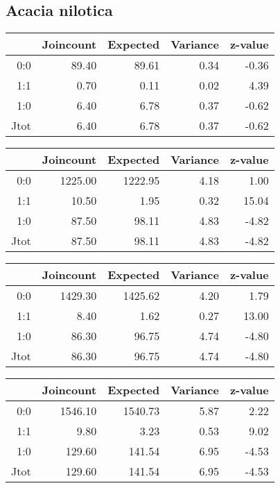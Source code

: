 \documentclass[a4paper, oneside, 12pt]{book}
\begin{document}
\subsection{Acacia nilotica}
\begin{table}[H]
	\centering
	\begin{tabular}{rrrrr}
		\hline
		& Joincount & Expected & Variance & z-value \\ 
		\hline
		0:0 & 89.40 & 89.61 & 0.34 & -0.36 \\ 
		1:1 & 0.70 & 0.11 & 0.02 & 4.39 \\ 
		1:0 & 6.40 & 6.78 & 0.37 & -0.62 \\ 
		Jtot & 6.40 & 6.78 & 0.37 & -0.62 \\ 
		\hline
	\end{tabular}
\end{table}

\begin{table}[H]
	\centering
	\begin{tabular}{rrrrr}
		\hline
		& Joincount & Expected & Variance & z-value \\ 
		\hline
		0:0 & 1225.00 & 1222.95 & 4.18 & 1.00 \\ 
		1:1 & 10.50 & 1.95 & 0.32 & 15.04 \\ 
		1:0 & 87.50 & 98.11 & 4.83 & -4.82 \\ 
		Jtot & 87.50 & 98.11 & 4.83 & -4.82 \\ 
		\hline
	\end{tabular}
\end{table}
\begin{table}[H]
	\centering
	\begin{tabular}{rrrrr}
		\hline
		& Joincount & Expected & Variance & z-value \\ 
		\hline
		0:0 & 1429.30 & 1425.62 & 4.20 & 1.79 \\ 
		1:1 & 8.40 & 1.62 & 0.27 & 13.00 \\ 
		1:0 & 86.30 & 96.75 & 4.74 & -4.80 \\ 
		Jtot & 86.30 & 96.75 & 4.74 & -4.80 \\ 
		\hline
	\end{tabular}
\end{table}
\begin{table}[H]
	\centering
	\begin{tabular}{rrrrr}
		\hline
		& Joincount & Expected & Variance & z-value \\ 
		\hline
		0:0 & 1546.10 & 1540.73 & 5.87 & 2.22 \\ 
		1:1 & 9.80 & 3.23 & 0.53 & 9.02 \\ 
		1:0 & 129.60 & 141.54 & 6.95 & -4.53 \\ 
		Jtot & 129.60 & 141.54 & 6.95 & -4.53 \\ 
		\hline
	\end{tabular}
\end{table}
\end{document}
